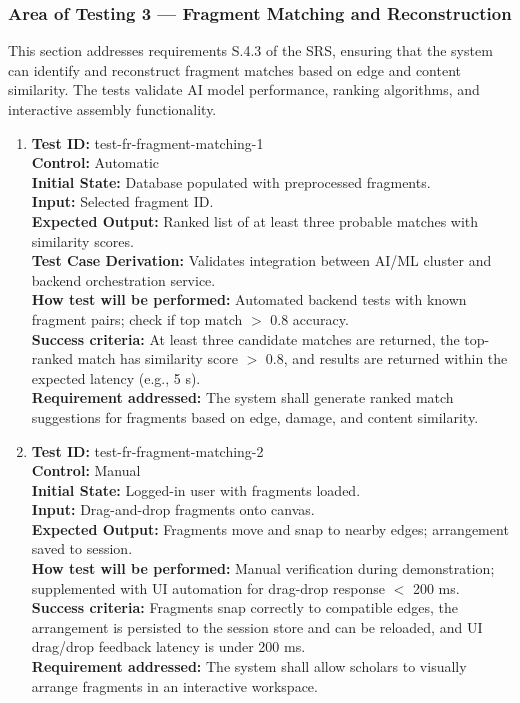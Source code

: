 \documentclass[12pt, titlepage]{article}
\begin{document}
\subsubsection{Area of Testing 3 — Fragment Matching and Reconstruction}

This section addresses requirements S.4.3 of the SRS, ensuring that the system can identify and reconstruct fragment matches based on edge and content similarity. The tests validate AI model performance, ranking algorithms, and interactive assembly functionality.

\begin{enumerate}
    \item
    \textbf{Test ID:} test-fr-fragment-matching-1\\
    \textbf{Control:} Automatic\\
    \textbf{Initial State:} Database populated with preprocessed fragments.\\
    \textbf{Input:} Selected fragment ID.\\
    \textbf{Expected Output:} Ranked list of at least three probable matches with similarity scores.\\
    \textbf{Test Case Derivation:} Validates integration between AI/ML cluster and backend orchestration service.\\
    \textbf{How test will be performed:} Automated backend tests with known fragment pairs; check if top match $>$ 0.8 accuracy.\\
    \textbf{Success criteria:} At least three candidate matches are returned, the top-ranked match has similarity score $>$ 0.8, and results are returned within the expected latency (e.g., 5 s).\\
    \textbf{Requirement addressed:} The system shall generate ranked match suggestions for fragments based on edge, damage, and content similarity.\\

    \item
    \textbf{Test ID:} test-fr-fragment-matching-2\\
    \textbf{Control:} Manual\\
    \textbf{Initial State:} Logged-in user with fragments loaded.\\
    \textbf{Input:} Drag-and-drop fragments onto canvas.\\
    \textbf{Expected Output:} Fragments move and snap to nearby edges; arrangement saved to session.\\
    \textbf{How test will be performed:} Manual verification during demonstration; supplemented with UI automation for drag-drop response $<$ 200 ms.\\
    \textbf{Success criteria:} Fragments snap correctly to compatible edges, the arrangement is persisted to the session store and can be reloaded, and UI drag/drop feedback latency is under 200 ms.\\
    \textbf{Requirement addressed:} The system shall allow scholars to visually arrange fragments in an interactive workspace.\\
\end{enumerate}
\end{document}
